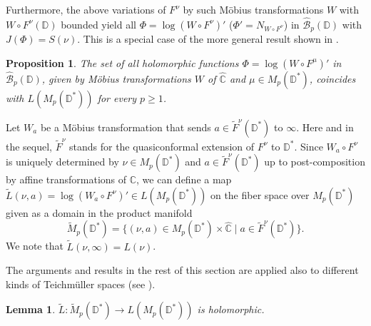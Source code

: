 \documentclass[amstex,12pt,reqno]{amsart}
\newtheorem{lemma}[theorem]{Lemma}
\newtheorem{proposition}[theorem]{Proposition}
\theoremstyle{definition}
\begin{document}
Furthermore, the above variations of $F^{\nu}$ by such M\"obius transformations $W$ with
$W \circ F^{\nu}(\mathbb D)$ bounded
yield all $\Phi=\log(W \circ F^{\nu})'$ ($\Phi'=N_{W \circ F^{\nu}}$) in $\widehat{\mathcal B}_p (\mathbb D)$
with $J(\Phi)=S(\nu)$. This is a special case of the more general result shown in \cite[Lemma 3.3]{Ma5}.

\begin{proposition}\label{onlyL}
The set of all holomorphic functions $\Phi=\log (W \circ F^\mu)'$ in $\widehat{\mathcal B}_p (\mathbb D)$,
given by M\"obius transformations $W$ of $\widehat{\mathbb C}$
and $\mu \in M_p(\mathbb D^*)$, coincides with $L(M_p(\mathbb D^*))$ for every $p \geq 1$.
\end{proposition}

Let $W_a$ be a M\"obius transformation that sends $a \in \widetilde F^\nu(\mathbb D^*)$ to $\infty$. 
Here and in the sequel, $\widetilde F^\nu$ stands for the quasiconformal extension of $F^\nu$ to $\mathbb D^*$.
Since $W_a \circ F^\nu$ is uniquely determined by $\nu \in M_p(\mathbb D^*)$ and $a \in \widetilde F^\nu(\mathbb D^*)$ up to post-composition by affine transformations of $\mathbb C$, 
we can define a map 
$\widetilde L(\nu,a)=\log(W_a \circ F^\nu)' \in L(M_p(\mathbb D^*))$ on 
the fiber space over $M_p(\mathbb D^*)$ given as a domain in the product manifold
$$
\widetilde M_p(\mathbb D^*)=\{(\nu,a) \in M_p(\mathbb D^*) \times \widehat{\mathbb C} 
\mid a \in \widetilde F^{\nu}(\mathbb D^*)\}.
$$
We note that $\widetilde L(\nu,\infty)=L(\nu)$.

The arguments and results in the rest of this section are applied also to different kinds of 
Teichm\"uller spaces (see \cite{Ma4, Ma5}).

\begin{lemma}\label{localbound}
$\widetilde L:\widetilde M_p(\mathbb D^*) \to L(M_p(\mathbb D^*))$ is holomorphic.
\end{lemma}
\end{document}
